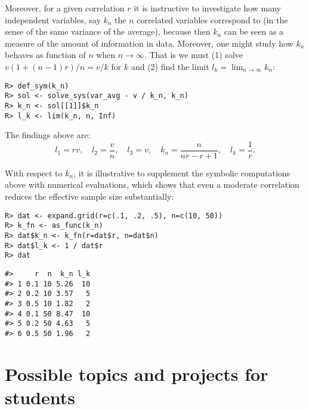 Moreover, for a given correlation \(r\) it is instructive to investigate
how many independent variables, say \(k_n\) the \(n\) correlated variables
correspond to (in the sense of the same variance of the average),
because then \(k_n\) can be seen as a measure of the amount of information
in data. Moreover, one might study how \(k_n\) behaves as function of \(n\)
when \(n \rightarrow \infty\). That is we must (1) solve \(v (1 + (n-1)r)/n = v/k\) for \(k\) and (2) find the limit \(l_k = \lim_{n\rightarrow\infty} k_n\):

\begin{verbatim}
R> def_sym(k_n)
R> sol <- solve_sys(var_avg - v / k_n, k_n)
R> k_n <- sol[[1]]$k_n
R> l_k <- lim(k_n, n, Inf)
\end{verbatim}

The findings above are:
\[
l_1 = r v, \quad
l_2 = \frac{v}{n}, \quad
l_3 = v, \quad
k_n = \frac{n}{n r - r + 1}, \quad 
l_k = \frac{1}{r} .
\]

With respect to \(k_n\), it is illustrative to supplement the symbolic
computations above with numerical evaluations, which shows that
even a moderate correlation reduces the effective sample size substantially:

\begin{verbatim}
R> dat <- expand.grid(r=c(.1, .2, .5), n=c(10, 50))
R> k_fn <- as_func(k_n)
R> dat$k_n <- k_fn(r=dat$r, n=dat$n)
R> dat$l_k <- 1 / dat$r
R> dat
\end{verbatim}

\begin{verbatim}
#>     r  n  k_n l_k
#> 1 0.1 10 5.26  10
#> 2 0.2 10 3.57   5
#> 3 0.5 10 1.82   2
#> 4 0.1 50 8.47  10
#> 5 0.2 50 4.63   5
#> 6 0.5 50 1.96   2
\end{verbatim}

\hypertarget{possible-topics-and-projects-for-students}{%
\section{Possible topics and projects for students}\label{possible-topics-and-projects-for-students}}

